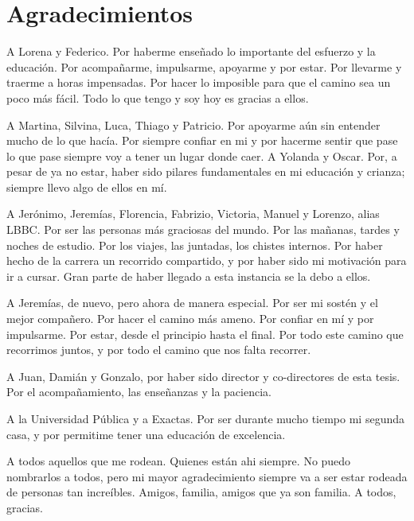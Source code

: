 \chapter*{Agradecimientos}

A Lorena y Federico. Por haberme enseñado lo importante del esfuerzo y la educación. Por acompañarme, impulsarme, apoyarme y por estar. Por llevarme y traerme a horas impensadas. Por hacer lo imposible para que el camino sea un poco más fácil. Todo lo que tengo y soy hoy es gracias a ellos.

A Martina, Silvina, Luca, Thiago y Patricio. Por apoyarme aún sin entender mucho de lo que hacía. Por siempre confiar en mi y por hacerme sentir que pase lo que pase siempre voy a tener un lugar donde caer.
A Yolanda y Oscar. Por, a pesar de ya no estar, haber sido pilares fundamentales en mi educación y crianza; siempre llevo algo de ellos en mí.

A Jerónimo, Jeremías, Florencia, Fabrizio, Victoria, Manuel y Lorenzo, alias LBBC. Por ser las personas más graciosas del mundo. Por las mañanas, tardes y noches de estudio. Por los viajes, las juntadas, los chistes internos. Por haber hecho de la carrera un recorrido compartido, y por haber sido mi motivación para ir a cursar. Gran parte de haber llegado a esta instancia se la debo a ellos.

A Jeremías, de nuevo, pero ahora de manera especial. Por ser mi sostén y el mejor compañero. Por hacer el camino más ameno. Por confiar en mí y por impulsarme. Por estar, desde el principio hasta el final. Por todo este camino que recorrimos juntos, y por todo el camino que nos falta recorrer.

A Juan, Damián y Gonzalo, por haber sido director y co-directores de esta tesis. Por el acompañamiento, las enseñanzas y la paciencia.

A la Universidad Pública y a Exactas. Por ser durante mucho tiempo mi segunda casa, y por permitime tener una educación de excelencia.

A todos aquellos que me rodean. Quienes están ahi siempre. No puedo nombrarlos a todos, pero mi mayor agradecimiento siempre va a ser estar rodeada de personas tan increíbles. Amigos, familia, amigos que ya son familia. A todos, gracias.